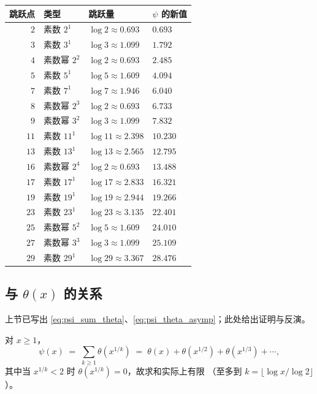 \begin{center}
\renewcommand{\arraystretch}{1.3}
\begin{tabular}{r|lll}
\toprule
跳跃点 & 类型 & 跳跃量 & $\psi$ 的新值 \\
\midrule
$2$ & 素数 $2^1$ & $\log 2 \approx 0.693$ & $0.693$ \\
$3$ & 素数 $3^1$ & $\log 3 \approx 1.099$ & $1.792$ \\
$4$ & 素数幂 $2^2$ & $\log 2 \approx 0.693$ & $2.485$ \\
$5$ & 素数 $5^1$ & $\log 5 \approx 1.609$ & $4.094$ \\
$7$ & 素数 $7^1$ & $\log 7 \approx 1.946$ & $6.040$ \\
$8$ & 素数幂 $2^3$ & $\log 2 \approx 0.693$ & $6.733$ \\
$9$ & 素数幂 $3^2$ & $\log 3 \approx 1.099$ & $7.832$ \\
$11$ & 素数 $11^1$ & $\log 11 \approx 2.398$ & $10.230$ \\
$13$ & 素数 $13^1$ & $\log 13 \approx 2.565$ & $12.795$ \\
$16$ & 素数幂 $2^4$ & $\log 2 \approx 0.693$ & $13.488$ \\
$17$ & 素数 $17^1$ & $\log 17 \approx 2.833$ & $16.321$ \\
$19$ & 素数 $19^1$ & $\log 19 \approx 2.944$ & $19.266$ \\
$23$ & 素数 $23^1$ & $\log 23 \approx 3.135$ & $22.401$ \\
$25$ & 素数幂 $5^2$ & $\log 5 \approx 1.609$ & $24.010$ \\
$27$ & 素数幂 $3^3$ & $\log 3 \approx 1.099$ & $25.109$ \\
$29$ & 素数 $29^1$ & $\log 29 \approx 3.367$ & $28.476$ \\
\bottomrule
\end{tabular}
\end{center}

\subsection{与 \texorpdfstring{$\theta(x)$}{theta(x)} 的关系}\label{subsec:psi_theta_rel}

上节已写出 \eqref{eq:psi_sum_theta}、\eqref{eq:psi_theta_asymp}；此处给出证明与反演。

\begin{theorem}{}{}
对 $x \ge 1$，
\begin{equation}
  \psi(x)
  \;=\;
  \sum_{k\ge 1}\theta\!\left(x^{1/k}\right)
  \;=\;
  \theta(x)+\theta\!\left(x^{1/2}\right)+\theta\!\left(x^{1/3}\right)+\cdots,
\label{eq:psi_sum_theta}
\end{equation}
其中当 $x^{1/k}<2$ 时 $\theta(x^{1/k})=0$，故求和实际上有限
（至多到 $k=\lfloor\log x/\log 2\rfloor$）。
\end{theorem}

